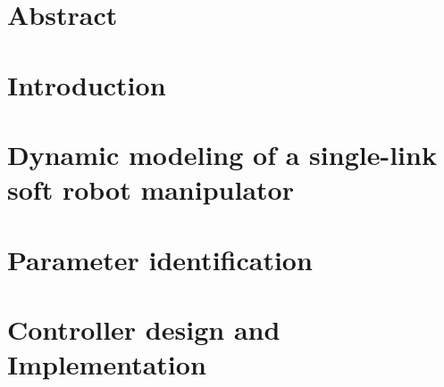 \documentclass[11pt,twoside]{report}
\begin{document}

\thispagestyle{empty}
\cleardoublepage



\chapter*{Abstract}

\cleardoublepage

\tableofcontents

\cleardoublepage

\cleardoublepage







\chapter{Introduction}

\cleardoublepage

\chapter{Dynamic modeling of a single-link soft robot manipulator}

\cleardoublepage

\chapter{Parameter identification}

\cleardoublepage


\chapter{Controller design and Implementation}

\cleardoublepage

%


%
\end{document}

